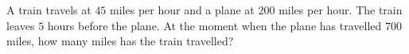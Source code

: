 A train travels at $45$ miles per hour and a plane at $200$ miles per hour. The train leaves $5$ hours before the plane. At the moment when the plane has travelled $700$ miles, how many miles has the train travelled?
